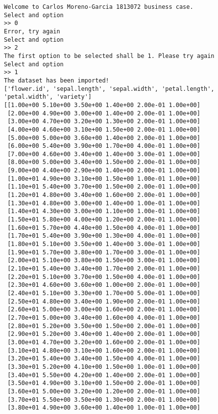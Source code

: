 \documentclass[11pt]{article}
\begin{document}
    \begin{Verbatim}[commandchars=\\\{\}]
Welcome to Carlos Moreno-Garcia 1813072 business case.
Select and option
>> 0
Error, try again
Select and option
>> 2
The first option to be selected shall be 1. Please try again
Select and option
>> 1
The dataset has been imported!
['flower.id', 'sepal.length', 'sepal.width', 'petal.length', 'petal.width', 'variety']
[[1.00e+00 5.10e+00 3.50e+00 1.40e+00 2.00e-01 1.00e+00]
 [2.00e+00 4.90e+00 3.00e+00 1.40e+00 2.00e-01 1.00e+00]
 [3.00e+00 4.70e+00 3.20e+00 1.30e+00 2.00e-01 1.00e+00]
 [4.00e+00 4.60e+00 3.10e+00 1.50e+00 2.00e-01 1.00e+00]
 [5.00e+00 5.00e+00 3.60e+00 1.40e+00 2.00e-01 1.00e+00]
 [6.00e+00 5.40e+00 3.90e+00 1.70e+00 4.00e-01 1.00e+00]
 [7.00e+00 4.60e+00 3.40e+00 1.40e+00 3.00e-01 1.00e+00]
 [8.00e+00 5.00e+00 3.40e+00 1.50e+00 2.00e-01 1.00e+00]
 [9.00e+00 4.40e+00 2.90e+00 1.40e+00 2.00e-01 1.00e+00]
 [1.00e+01 4.90e+00 3.10e+00 1.50e+00 1.00e-01 1.00e+00]
 [1.10e+01 5.40e+00 3.70e+00 1.50e+00 2.00e-01 1.00e+00]
 [1.20e+01 4.80e+00 3.40e+00 1.60e+00 2.00e-01 1.00e+00]
 [1.30e+01 4.80e+00 3.00e+00 1.40e+00 1.00e-01 1.00e+00]
 [1.40e+01 4.30e+00 3.00e+00 1.10e+00 1.00e-01 1.00e+00]
 [1.50e+01 5.80e+00 4.00e+00 1.20e+00 2.00e-01 1.00e+00]
 [1.60e+01 5.70e+00 4.40e+00 1.50e+00 4.00e-01 1.00e+00]
 [1.70e+01 5.40e+00 3.90e+00 1.30e+00 4.00e-01 1.00e+00]
 [1.80e+01 5.10e+00 3.50e+00 1.40e+00 3.00e-01 1.00e+00]
 [1.90e+01 5.70e+00 3.80e+00 1.70e+00 3.00e-01 1.00e+00]
 [2.00e+01 5.10e+00 3.80e+00 1.50e+00 3.00e-01 1.00e+00]
 [2.10e+01 5.40e+00 3.40e+00 1.70e+00 2.00e-01 1.00e+00]
 [2.20e+01 5.10e+00 3.70e+00 1.50e+00 4.00e-01 1.00e+00]
 [2.30e+01 4.60e+00 3.60e+00 1.00e+00 2.00e-01 1.00e+00]
 [2.40e+01 5.10e+00 3.30e+00 1.70e+00 5.00e-01 1.00e+00]
 [2.50e+01 4.80e+00 3.40e+00 1.90e+00 2.00e-01 1.00e+00]
 [2.60e+01 5.00e+00 3.00e+00 1.60e+00 2.00e-01 1.00e+00]
 [2.70e+01 5.00e+00 3.40e+00 1.60e+00 4.00e-01 1.00e+00]
 [2.80e+01 5.20e+00 3.50e+00 1.50e+00 2.00e-01 1.00e+00]
 [2.90e+01 5.20e+00 3.40e+00 1.40e+00 2.00e-01 1.00e+00]
 [3.00e+01 4.70e+00 3.20e+00 1.60e+00 2.00e-01 1.00e+00]
 [3.10e+01 4.80e+00 3.10e+00 1.60e+00 2.00e-01 1.00e+00]
 [3.20e+01 5.40e+00 3.40e+00 1.50e+00 4.00e-01 1.00e+00]
 [3.30e+01 5.20e+00 4.10e+00 1.50e+00 1.00e-01 1.00e+00]
 [3.40e+01 5.50e+00 4.20e+00 1.40e+00 2.00e-01 1.00e+00]
 [3.50e+01 4.90e+00 3.10e+00 1.50e+00 2.00e-01 1.00e+00]
 [3.60e+01 5.00e+00 3.20e+00 1.20e+00 2.00e-01 1.00e+00]
 [3.70e+01 5.50e+00 3.50e+00 1.30e+00 2.00e-01 1.00e+00]
 [3.80e+01 4.90e+00 3.60e+00 1.40e+00 1.00e-01 1.00e+00]

\end{Verbatim}
\end{document}
